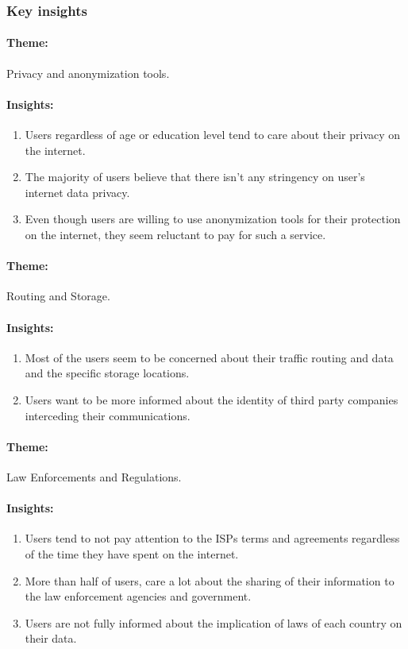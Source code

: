 \subsubsection{Key insights} 

\vspace{0.4cm}
\paragraph{Theme:} Privacy and anonymization tools.
\paragraph{Insights:}
\begin{enumerate}
\item
Users regardless of age or education level tend to care about their privacy on 
the internet.
\item
The majority of users believe that there isn't any stringency on user's internet 
data privacy.
\item
Even though users are willing to use anonymization tools for their protection on 
the internet, they seem reluctant to pay for such a service.
\end{enumerate}

\vspace{0.1cm}
\paragraph{Theme:} Routing and Storage. 
\paragraph{Insights:}
\begin{enumerate}
\item
Most of the users seem to be concerned about their traffic routing and data and 
the specific storage locations.
\item
Users want to be more informed about the identity of third party companies 
interceding their communications.
\end{enumerate}

\vspace{0.1cm}
\paragraph{Theme:} Law Enforcements and Regulations.
\paragraph{Insights:}
\begin{enumerate}
\item
Users tend to not pay attention to the ISPs terms and agreements regardless of 
the time they have spent on the internet. 
\item
More than half of users, care a lot about the sharing of their information to 
the law enforcement agencies and government.
\item
Users are not fully informed about the implication of laws of each country on 
their data.
\end{enumerate}

